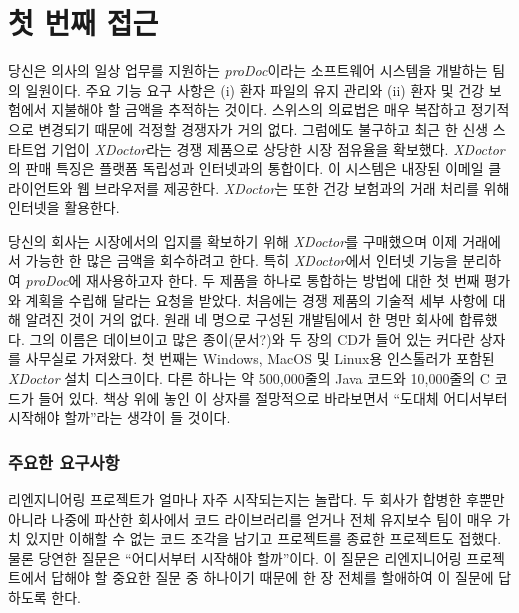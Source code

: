 \documentclass[a4paper,10pt,twoside]{book}
\begin{document}
	\renewcommand{\nnbb}[2]{} %
	\sloppy
\fi
\chapter{첫 번째 접근}

당신은 의사의 일상 업무를 지원하는 \emph{proDoc}이라는 소프트웨어 시스템을 개발하는 팀의 일원이다.
주요 기능 요구 사항은 (i) 환자 파일의 유지 관리와 (ii) 환자 및 건강 보험에서 지불해야 할 금액을 추적하는 것이다. 스위스의 의료법은 매우 복잡하고 정기적으로 변경되기 때문에 걱정할 경쟁자가 거의 없다. 그럼에도 불구하고 최근 한 신생 스타트업 기업이 \emph{XDoctor}라는 경쟁 제품으로 상당한 시장 점유율을 확보했다. \emph{XDoctor}의 판매 특징은 플랫폼 독립성과 인터넷과의 통합이다. 이 시스템은 내장된 이메일 클라이언트와 웹 브라우저를 제공한다. \emph{XDoctor}는 또한 건강 보험과의 거래 처리를 위해 인터넷을 활용한다.

당신의 회사는 시장에서의 입지를 확보하기 위해 \emph{XDoctor}를 구매했으며 이제 거래에서 가능한 한 많은 금액을 회수하려고 한다. 특히 \emph{XDoctor}에서 인터넷 기능을 분리하여 \emph{proDoc}에 재사용하고자 한다. 두 제품을 하나로 통합하는 방법에 대한 첫 번째 평가와 계획을 수립해 달라는 요청을 받았다. 처음에는 경쟁 제품의 기술적 세부 사항에 대해 알려진 것이 거의 없다. 원래 네 명으로 구성된 개발팀에서 한 명만 회사에 합류했다. 그의 이름은 데이브이고 많은 종이(문서?)와 두 장의 CD가 들어 있는 커다란 상자를 사무실로 가져왔다. 첫 번째는 Windows, MacOS 및 Linux용 인스톨러가 포함된 \emph{XDoctor} 설치 디스크이다. 다른 하나는 약 500,000줄의 Java 코드와 10,000줄의 C 코드가 들어 있다. 책상 위에 놓인 이 상자를 절망적으로 바라보면서 ``도대체 어디서부터 시작해야 할까''라는 생각이 들 것이다.

\subsection*{주요한 요구사항}

리엔지니어링 프로젝트가 얼마나 자주 시작되는지는 놀랍다. 두 회사가 합병한 후뿐만 아니라 나중에 파산한 회사에서 코드 라이브러리를 얻거나 전체 유지보수 팀이 매우 가치 있지만 이해할 수 없는 코드 조각을 남기고 프로젝트를 종료한 프로젝트도 접했다. 물론 당연한 질문은  ``어디서부터 시작해야 할까''이다. 이 질문은 리엔지니어링 프로젝트에서 답해야 할 중요한 질문 중 하나이기 때문에 한 장 전체를 할애하여 이 질문에 답하도록 한다.
\end{document}
